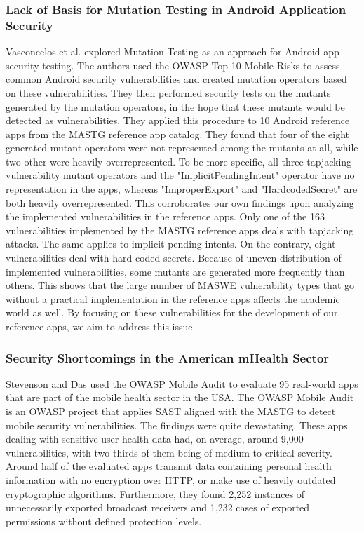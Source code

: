 \subsubsection{Lack of Basis for Mutation Testing in Android Application Security}
Vasconcelos et al. \citep{paper_10} explored Mutation Testing as an approach for Android app security testing. The authors used the OWASP Top 10 Mobile Risks to assess common Android security vulnerabilities and created mutation operators based on these vulnerabilities. They then performed security tests on the mutants generated by the mutation operators, in the hope that these mutants would be detected as vulnerabilities. They applied this procedure to 10 Android reference apps from the MASTG reference app catalog. They found that four of the eight generated mutant operators were not represented among the mutants at all, while two other were heavily overrepresented. To be more specific, all three tapjacking vulnerability mutant operators and the "ImplicitPendingIntent" operator have no representation in the apps, whereas "ImproperExport" and "HardcodedSecret" are both heavily overrepresented. This corroborates our own findings upon analyzing the implemented vulnerabilities in the reference apps. Only one of the 163 vulnerabilities implemented by the MASTG reference apps deals with tapjacking attacks. The same applies to implicit pending intents. On the contrary, eight vulnerabilities deal with hard-coded secrets. Because of uneven distribution of implemented vulnerabilities, some mutants are generated more frequently than others. This shows that the large number of MASWE vulnerability types that go without a practical implementation in the reference apps affects the academic world as well. By focusing on these vulnerabilities for the development of our reference apps, we aim to address this issue. 

\subsubsection{Security Shortcomings in the American mHealth Sector}
Stevenson and Das \citep{paper_14} used the OWASP Mobile Audit to evaluate 95 real-world apps that are part of the mobile health sector in the USA. The OWASP Mobile Audit is an OWASP project that applies SAST aligned with the MASTG to detect mobile security vulnerabilities. The findings were quite devastating. These apps dealing with sensitive user health data had, on average, around 9,000 vulnerabilities, with two thirds of them being of medium to critical severity. Around half of the evaluated apps transmit data containing personal health information with no encryption over HTTP, or make use of heavily outdated cryptographic algorithms. Furthermore, they found 2,252 instances of unnecessarily exported broadcast receivers and 1,232 cases of exported permissions without defined protection levels. 

